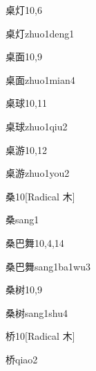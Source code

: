 \begin{entry}{桌灯}{10,6}
  \begin{phonetics}{桌灯}{zhuo1deng1}
  \end{phonetics}
\end{entry}

\begin{entry}{桌面}{10,9}
  \begin{phonetics}{桌面}{zhuo1mian4}
  \end{phonetics}
\end{entry}

\begin{entry}{桌球}{10,11}
  \begin{phonetics}{桌球}{zhuo1qiu2}
  \end{phonetics}
\end{entry}

\begin{entry}{桌游}{10,12}
  \begin{phonetics}{桌游}{zhuo1you2}
  \end{phonetics}
\end{entry}

\begin{entry}{桑}{10}[Radical 木]
  \begin{phonetics}{桑}{sang1}
  \end{phonetics}
\end{entry}

\begin{entry}{桑巴舞}{10,4,14}
  \begin{phonetics}{桑巴舞}{sang1ba1wu3}
  \end{phonetics}
\end{entry}

\begin{entry}{桑树}{10,9}
  \begin{phonetics}{桑树}{sang1shu4}
  \end{phonetics}
\end{entry}

\begin{entry}{桥}{10}[Radical 木]
  \begin{phonetics}{桥}{qiao2}
  \end{phonetics}
\end{entry}

